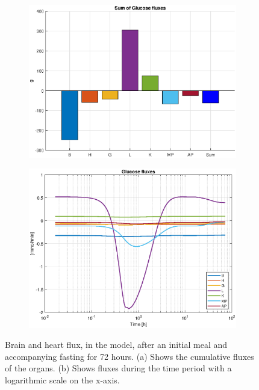 \documentclass{IEEEtran}
\begin{document}
\begin{figure}[H]
     \centering
     \begin{subfigure}{1\columnwidth}
         \centering
         \caption{}
         \includegraphics[width=\columnwidth]{Diagrams/Fasting/Flux/bar_plot_flux.eps}
         \label{fig:barplot_glucose}
     \end{subfigure}
     \hfill
     \begin{subfigure}{1\columnwidth}
         \centering
         \caption{}
         \includegraphics[width=\columnwidth]{Diagrams/Fasting/Flux/glucose_flux.eps}
         \label{fig:glucose_flux_plot}
     \end{subfigure}
     \caption[short]{Brain and heart flux, in the model, after an initial meal and accompanying fasting for 72 hours. (a) Shows the cumulative fluxes of the organs. (b) Shows fluxes during the time period with a logarithmic scale on the x-axis.}
    \label{fig:glucose_flux}
\end{figure}
\end{document}
